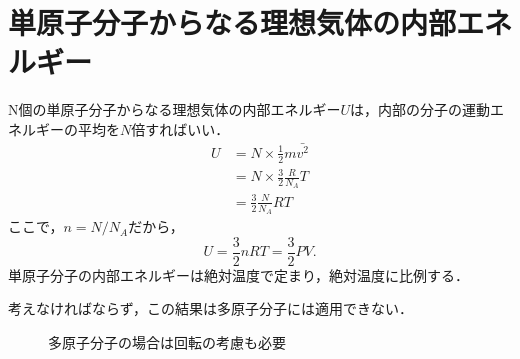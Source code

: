     \section{単原子分子からなる理想気体の内部エネルギー}
    N個の単原子分子からなる理想気体の内部エネルギー$U$は，内部の分子の運動エネルギーの平均を$N$倍すればいい．
    \begin{align*}
        U &= N \times \frac{1}{2}m\bar{{v}^{2}} \\
          &= N \times \frac{3}{2} \frac{R}{{N}_{A}}T    \\
          &= \frac{3}{2} \frac{N}{{N}_{A}}RT
    \end{align*}
    ここで，$n=N/{N}_{A}$だから，
    \begin{equation}
        U = \frac{3}{2} nRT = \frac{3}{2} PV.
    \end{equation}
    単原子分子の内部エネルギーは絶対温度で定まり，絶対温度に比例する．

    考えなければならず，この結果は多原子分子には適用できない．
    \begin{figure}[hbt]
        \begin{center}
            \caption{多原子分子の場合は回転の考慮も必要}
            \label{fig:netsurikigaku_bunsi_undo_ron_tangensibunsi}
        \end{center}
    \end{figure}
